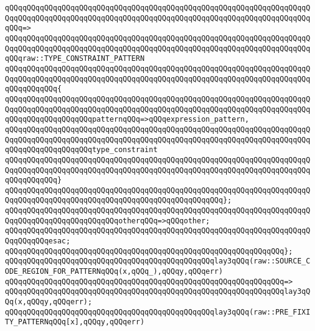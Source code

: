 \verb|qQQqqQQqqQQqqQQqqQQqqQQqqQQqqQQqqQQqqQQqqQQqqQQqqQQqqQQqqQQqqQQqqQQqqQQqqQQqqQQqqQQqqQQqqQQqqQQqqQQqqQQqqQQqqQQqqQQqqQQqqQQqqQQqqQQqqQQqqQQqqQQq=>|\newline
\verb|qQQqqQQqqQQqqQQqqQQqqQQqqQQqqQQqqQQqqQQqqQQqqQQqqQQqqQQqqQQqqQQqqQQqqQQqqQQqqQQqqQQqqQQqqQQqqQQqqQQqqQQqqQQqqQQqqQQqqQQqqQQqqQQqqQQqqQQqqQQqqQQqraw::TYPE_CONSTRAINT_PATTERN|\newline
\verb|qQQqqQQqqQQqqQQqqQQqqQQqqQQqqQQqqQQqqQQqqQQqqQQqqQQqqQQqqQQqqQQqqQQqqQQqqQQqqQQqqQQqqQQqqQQqqQQqqQQqqQQqqQQqqQQqqQQqqQQqqQQqqQQqqQQqqQQqqQQqqQQqqQQqqQQq{|\newline
\verb|qQQqqQQqqQQqqQQqqQQqqQQqqQQqqQQqqQQqqQQqqQQqqQQqqQQqqQQqqQQqqQQqqQQqqQQqqQQqqQQqqQQqqQQqqQQqqQQqqQQqqQQqqQQqqQQqqQQqqQQqqQQqqQQqqQQqqQQqqQQqqQQqqQQqqQQqqQQqqQQqpatternqQQq=>qQQqexpression_pattern,|\newline
\verb|qQQqqQQqqQQqqQQqqQQqqQQqqQQqqQQqqQQqqQQqqQQqqQQqqQQqqQQqqQQqqQQqqQQqqQQqqQQqqQQqqQQqqQQqqQQqqQQqqQQqqQQqqQQqqQQqqQQqqQQqqQQqqQQqqQQqqQQqqQQqqQQqqQQqqQQqqQQqqQQqtype_constraint|\newline
\verb|qQQqqQQqqQQqqQQqqQQqqQQqqQQqqQQqqQQqqQQqqQQqqQQqqQQqqQQqqQQqqQQqqQQqqQQqqQQqqQQqqQQqqQQqqQQqqQQqqQQqqQQqqQQqqQQqqQQqqQQqqQQqqQQqqQQqqQQqqQQqqQQqqQQqqQQq}|\newline
\verb|qQQqqQQqqQQqqQQqqQQqqQQqqQQqqQQqqQQqqQQqqQQqqQQqqQQqqQQqqQQqqQQqqQQqqQQqqQQqqQQqqQQqqQQqqQQqqQQqqQQqqQQqqQQqqQQqqQQqqQQq};|\newline
\newline
\verb|qQQqqQQqqQQqqQQqqQQqqQQqqQQqqQQqqQQqqQQqqQQqqQQqqQQqqQQqqQQqqQQqqQQqqQQqqQQqqQQqqQQqqQQqqQQqqQQqotherqQQq=>qQQqother;|\newline
\verb|qQQqqQQqqQQqqQQqqQQqqQQqqQQqqQQqqQQqqQQqqQQqqQQqqQQqqQQqqQQqqQQqqQQqqQQqqQQqqQQqesac;|\newline
\verb|qQQqqQQqqQQqqQQqqQQqqQQqqQQqqQQqqQQqqQQqqQQqqQQqqQQqqQQqqQQqqQQq};|\newline
\newline
\verb|qQQqqQQqqQQqqQQqqQQqqQQqqQQqqQQqqQQqqQQqqQQqqQQqlay3qQQq(raw::SOURCE_CODE_REGION_FOR_PATTERNqQQq(x,qQQq_),qQQqy,qQQqerr)|\newline
\verb|qQQqqQQqqQQqqQQqqQQqqQQqqQQqqQQqqQQqqQQqqQQqqQQqqQQqqQQqqQQqqQQq=>|\newline
\verb|qQQqqQQqqQQqqQQqqQQqqQQqqQQqqQQqqQQqqQQqqQQqqQQqqQQqqQQqqQQqqQQqlay3qQQq(x,qQQqy,qQQqerr);|\newline
\newline
\verb|qQQqqQQqqQQqqQQqqQQqqQQqqQQqqQQqqQQqqQQqqQQqqQQqlay3qQQq(raw::PRE_FIXITY_PATTERNqQQq[x],qQQqy,qQQqerr)|\newline
